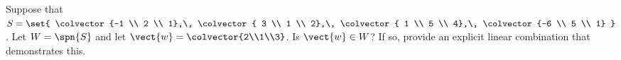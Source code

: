 Suppose that $S=\set{
\colvector{-1 \\ 2 \\ 1},\,
\colvector{ 3 \\ 1 \\ 2},\,
\colvector{ 1 \\ 5 \\ 4},\,
\colvector{-6 \\ 5 \\ 1}
}$. Let $W=\spn{S}$ and let $\vect{w}=\colvector{2\\1\\3}$.  Is $\vect{w}\in W$?  If so, provide an explicit linear combination that demonstrates this.